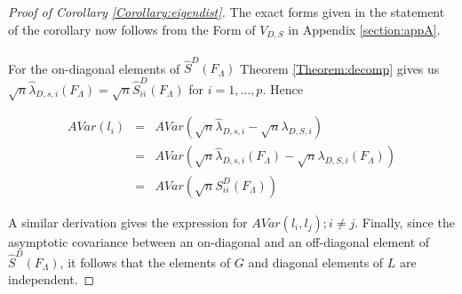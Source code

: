 \documentclass[fleqn,11pt]{article}
\begin{document}
\begin{proof}[Proof of Corollary \ref{Corollary:eigendist}]
The exact forms given in the statement of the corollary now follows from the  Form of $V_{D,S}$ in Appendix \ref{section:appA}.

\paragraph{}For the on-diagonal elements of $\hat S^D(F_\Lambda)$ Theorem \ref{Theorem:decomp} gives us $ \sqrt n \hat\lambda_{D,s,i} (F_\Lambda) = \sqrt n \hat S^D_{ii}(F_\Lambda)$ for $i = 1,...,p$. Hence

\begin{eqnarray*}
AVar(l_i) &=& AVar(\sqrt n \hat\lambda_{D,s,i} - \sqrt n \lambda_{D,S,i})\\
&=& AVar(\sqrt n \hat\lambda_{D,s,i} (F_\Lambda) - \sqrt n \lambda_{D,S,i}(F_\Lambda))\\
&=& AVar(\sqrt n S^D_{ii}(F_\Lambda))
\end{eqnarray*}

A similar derivation gives the expression for $AVar(l_i,l_j); i \neq j$. Finally, since the asymptotic covariance between an on-diagonal and an off-diagonal element of $\hat S^D(F_\Lambda)$, it follows that the elements of $G$ and diagonal elements of $L$ are independent.
\end{proof}



\end{document}
